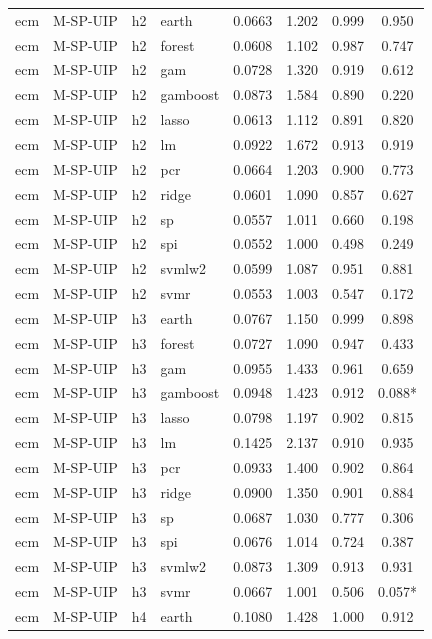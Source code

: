 \begin{ThreePartTable}
\begin{longtable}[t]{llclcccc}
\addlinespace
ecm & M-SP-UIP & h2 & earth & 0.0663 & 1.202 & 0.999 & 0.950\\
ecm & M-SP-UIP & h2 & forest & 0.0608 & 1.102 & 0.987 & 0.747\\
ecm & M-SP-UIP & h2 & gam & 0.0728 & 1.320 & 0.919 & 0.612\\
ecm & M-SP-UIP & h2 & gamboost & 0.0873 & 1.584 & 0.890 & 0.220\\
ecm & M-SP-UIP & h2 & lasso & 0.0613 & 1.112 & 0.891 & 0.820\\
ecm & M-SP-UIP & h2 & lm & 0.0922 & 1.672 & 0.913 & 0.919\\
ecm & M-SP-UIP & h2 & pcr & 0.0664 & 1.203 & 0.900 & 0.773\\
ecm & M-SP-UIP & h2 & ridge & 0.0601 & 1.090 & 0.857 & 0.627\\
ecm & M-SP-UIP & h2 & sp & 0.0557 & 1.011 & 0.660 & 0.198\\
ecm & M-SP-UIP & h2 & spi & 0.0552 & 1.000 & 0.498 & 0.249\\
ecm & M-SP-UIP & h2 & svmlw2 & 0.0599 & 1.087 & 0.951 & 0.881\\
ecm & M-SP-UIP & h2 & svmr & 0.0553 & 1.003 & 0.547 & 0.172\\
\addlinespace
ecm & M-SP-UIP & h3 & earth & 0.0767 & 1.150 & 0.999 & 0.898\\
ecm & M-SP-UIP & h3 & forest & 0.0727 & 1.090 & 0.947 & 0.433\\
ecm & M-SP-UIP & h3 & gam & 0.0955 & 1.433 & 0.961 & 0.659\\
ecm & M-SP-UIP & h3 & gamboost & 0.0948 & 1.423 & 0.912 & 0.088*\\
ecm & M-SP-UIP & h3 & lasso & 0.0798 & 1.197 & 0.902 & 0.815\\
ecm & M-SP-UIP & h3 & lm & 0.1425 & 2.137 & 0.910 & 0.935\\
ecm & M-SP-UIP & h3 & pcr & 0.0933 & 1.400 & 0.902 & 0.864\\
ecm & M-SP-UIP & h3 & ridge & 0.0900 & 1.350 & 0.901 & 0.884\\
ecm & M-SP-UIP & h3 & sp & 0.0687 & 1.030 & 0.777 & 0.306\\
ecm & M-SP-UIP & h3 & spi & 0.0676 & 1.014 & 0.724 & 0.387\\
ecm & M-SP-UIP & h3 & svmlw2 & 0.0873 & 1.309 & 0.913 & 0.931\\
ecm & M-SP-UIP & h3 & svmr & 0.0667 & 1.001 & 0.506 & 0.057*\\
\addlinespace
ecm & M-SP-UIP & h4 & earth & 0.1080 & 1.428 & 1.000 & 0.912\\

\end{longtable}
\end{ThreePartTable}
